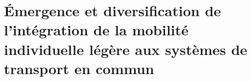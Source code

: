 
\chapter
{Émergence et diversification de l’intégration de la mobilité individuelle légère aux systèmes de transport en commun
    \label{chap4:titre}
    }
    \begin{refsegment}



\end{refsegment}
